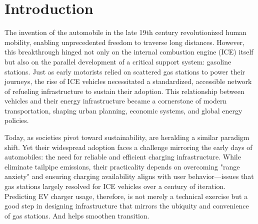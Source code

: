 \chapter*{Introduction\;}

The invention of the automobile in the late 19th century revolutionized human mobility, enabling unprecedented freedom to traverse long distances. However, this breakthrough hinged not only on the internal combustion engine (ICE) itself but also on the parallel development of a critical support system: gasoline stations. Just as early motorists relied on scattered gas stations to power their journeys, the rise of ICE vehicles necessitated a standardized, accessible network of refueling infrastructure to sustain their adoption. This  relationship between vehicles and their energy infrastructure became a cornerstone of modern transportation, shaping urban planning, economic systems, and global energy policies.


Today, as societies pivot toward sustainability,  are heralding a similar paradigm shift. Yet their widespread adoption faces a challenge mirroring the early days of automobiles: the need for reliable and efficient charging infrastructure. While  eliminate tailpipe emissions, their practicality depends on overcoming "range anxiety" and ensuring charging availability aligns with user behavior—issues that gas stations largely resolved for ICE vehicles over a century of iteration. Predicting EV charger usage, therefore, is not merely a technical exercise but a good step in designing infrastructure that mirrors the ubiquity and convenience of gas stations. And helps smoothen transition.
